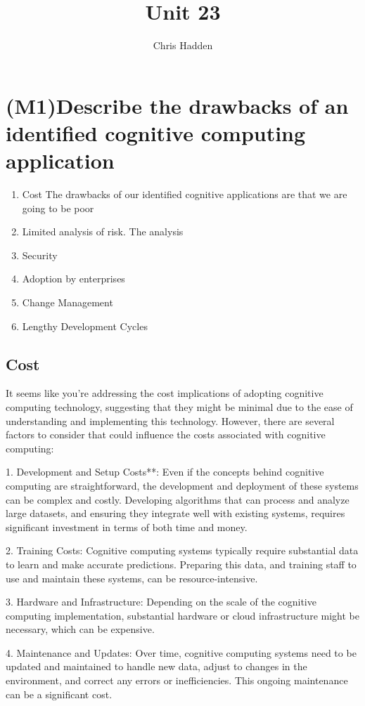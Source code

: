 \documentclass{article}
\title{Unit 23}
\author{Chris Hadden}
\date{}
\begin{document}
\maketitle

\section{(M1)Describe the drawbacks of an identified cognitive computing application}

\begin{enumerate}
	\item Cost The drawbacks of our identified cognitive  applications are that we are going to be poor
	\item Limited analysis of risk. The analysis 
	\item Security
	\item Adoption by enterprises
	\item Change Management
	\item Lengthy Development Cycles
\end{enumerate}
\subsection{ Cost}
It seems like you're addressing the cost implications of adopting cognitive computing technology, suggesting that they might be minimal due to the ease of understanding and implementing this technology. However, there are several factors to consider that could influence the costs associated with cognitive computing:

1. Development and Setup Costs**: Even if the concepts behind cognitive computing are straightforward, the development and deployment of these systems can be complex and costly. Developing algorithms that can process and analyze large datasets, and ensuring they integrate well with existing systems, requires significant investment in terms of both time and money.

2. Training Costs: Cognitive computing systems typically require substantial data to learn and make accurate predictions. Preparing this data, and training staff to use and maintain these systems, can be resource-intensive.

3. Hardware and Infrastructure: Depending on the scale of the cognitive computing implementation, substantial hardware or cloud infrastructure might be necessary, which can be expensive.

4. Maintenance and Updates: Over time, cognitive computing systems need to be updated and maintained to handle new data, adjust to changes in the environment, and correct any errors or inefficiencies. This ongoing maintenance can be a significant cost.
\end{document}
